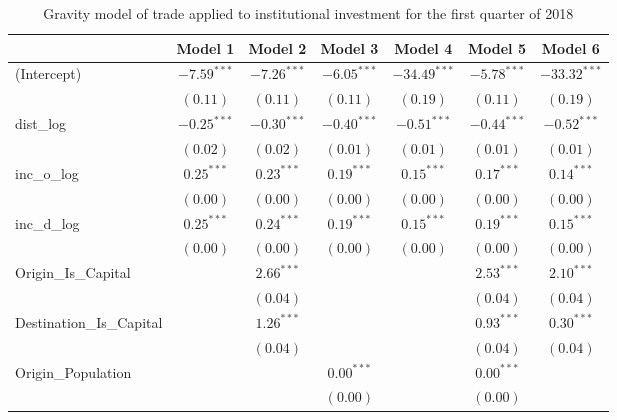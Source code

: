 \begin{table}
	\begin{center}
		\caption[CGravity Model of Trade for Q1 2018]{Gravity model of trade applied to institutional investment for the first quarter of 2018}
		\begin{tabular}{l c c c c c c }
			\hline
			& Model 1 & Model 2 & Model 3 & Model 4 & Model 5 & Model 6 \\
			\hline
			(Intercept)                  & $-7.59^{***}$ & $-7.26^{***}$ & $-6.05^{***}$ & $-34.49^{***}$ & $-5.78^{***}$ & $-33.32^{***}$ \\
			& $(0.11)$      & $(0.11)$      & $(0.11)$      & $(0.19)$       & $(0.11)$      & $(0.19)$       \\
			dist\_log                    & $-0.25^{***}$ & $-0.30^{***}$ & $-0.40^{***}$ & $-0.51^{***}$  & $-0.44^{***}$ & $-0.52^{***}$  \\
			& $(0.02)$      & $(0.02)$      & $(0.01)$      & $(0.01)$       & $(0.01)$      & $(0.01)$       \\
			inc\_o\_log                  & $0.25^{***}$  & $0.23^{***}$  & $0.19^{***}$  & $0.15^{***}$   & $0.17^{***}$  & $0.14^{***}$   \\
			& $(0.00)$      & $(0.00)$      & $(0.00)$      & $(0.00)$       & $(0.00)$      & $(0.00)$       \\
			inc\_d\_log                  & $0.25^{***}$  & $0.24^{***}$  & $0.19^{***}$  & $0.15^{***}$   & $0.19^{***}$  & $0.15^{***}$   \\
			& $(0.00)$      & $(0.00)$      & $(0.00)$      & $(0.00)$       & $(0.00)$      & $(0.00)$       \\
			Origin\_Is\_Capital          &               & $2.66^{***}$  &               &                & $2.53^{***}$  & $2.10^{***}$   \\
			&               & $(0.04)$      &               &                & $(0.04)$      & $(0.04)$       \\
			Destination\_Is\_Capital     &               & $1.26^{***}$  &               &                & $0.93^{***}$  & $0.30^{***}$   \\
			&               & $(0.04)$      &               &                & $(0.04)$      & $(0.04)$       \\
			Origin\_Population           &               &               & $0.00^{***}$  &                & $0.00^{***}$  &                \\
			&               &               & $(0.00)$      &                & $(0.00)$      &                \\

\end{tabular}
\end{center}
\end{table}
